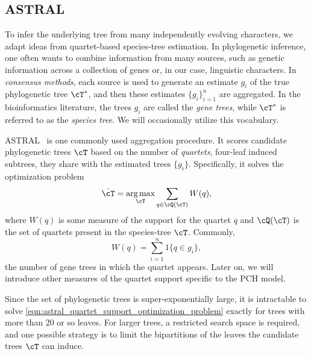 \subsection{ASTRAL}

To infer the underlying tree from many independently evolving characters, we adapt ideas from
quartet-based species-tree estimation. In phylogenetic inference, one often wants to combine information from many sources, such as genetic information across
a collection of genes or, in our case, linguistic characters. In \textit{consensus methods}, each source is
used to generate an estimate $g_i$ of the true phylogenetic tree $\cT^*$, and then these estimates $\{g_i\}_{i=1}^n$
are aggregated. In the bioinformatics literature, the trees $g_i$ are called the \textit{gene trees}, while $\cT^*$ is
referred to as the \textit{species tree}. We will occasionally utilize this vocabulary.

ASTRAL~\cite{mirarab2014_astral_species_tree_estimation} is one commonly used aggregation procedure. It scores candidate
phylogenetic trees $\cT$ based on the number of \textit{quartets}, four-leaf induced subtrees, they share with the estimated trees $\{g_i\}$. Specifically,
it solves the optimization problem
%
\begin{equation}
    \hat{\cT} = \argmax_\cT  \sum_{q \in \cQ(\cT)} W(q),
    \label{eqn:astral_quartet_support_optimization_problem}
\end{equation}
%
\noindent where $W(q)$ is some measure of the support for the quartet $q$ and 
$\cQ(\cT)$ is the set of quartets present in the species-tree $\cT$. Commonly,
%
    \[W(q) = \sum_{i=1}^n 1 \{q \in g_i\},\]
%
\noindent the number of gene trees in which the quartet appears. Later on, we will introduce
other measures of the quartet support specific to the PCH model.

Since the set of phylogenetic trees is super-exponentially large, it is intractable to solve \eqref{eqn:astral_quartet_support_optimization_problem}
exactly for trees with more than 20 or so leaves. For larger trees, a
restricted search space is required, and one possible strategy is to limit the bipartitions of the leaves the candidate trees $\cT$ can induce.

